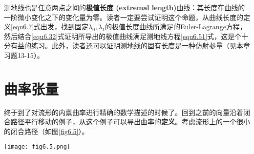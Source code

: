 测地线也是任意两点之间的\textbf{极值长度 (extremal length)}曲线：其长度在曲线的一阶微小变化之下的变化量为零。读者一定要尝试证明这个命题，从曲线长度的定义\eqref{equ6.7}式出发，找到固定$\lambda_0, \lambda_1$的极值长度曲线所满足的Euler-Lagrange方程，然后结合\eqref{equ6.32}式证明所导出的极值曲线满足测地线方程\eqref{equ6.51}式，这是个十分有益的练习。此外，读者还可以证明测地线的固有长度是一种仿射参量（见本章习题13-15）。

\section{曲率张量}
\label{sec6.5}
终于到了对流形的内禀曲率进行精确的数学描述的时候了。回到之前的向量沿着闭合路径平行移动的例子，从这个例子可以导出曲率的\textbf{定义}。考虑流形上的一个很小的闭合路径（如图\ref{fig6.5}）。

{
    \centering
    \texttt{[image: fig6.5.png]}
    \label{fig6.5}
}

